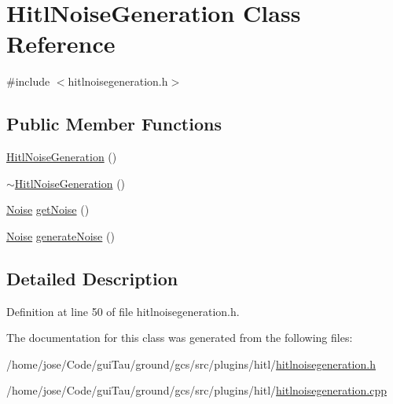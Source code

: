 \hypertarget{class_hitl_noise_generation}{\section{Hitl\-Noise\-Generation Class Reference}
\label{class_hitl_noise_generation}
}


{\ttfamily \#include $<$hitlnoisegeneration.\-h$>$}

\subsection*{Public Member Functions}
\begin{DoxyCompactItemize}
\item 
\hyperlink{group__hitlplugin_ga1dab19a6599c296ffb839d1449789da2}{Hitl\-Noise\-Generation} ()
\item 
\hyperlink{group__hitlplugin_ga86eb1b28193cc2594ee5bd38658eb06a}{$\sim$\-Hitl\-Noise\-Generation} ()
\item 
\hyperlink{struct_noise}{Noise} \hyperlink{group__hitlplugin_ga48da3a2284408957fb754e0e4488ab16}{get\-Noise} ()
\item 
\hyperlink{struct_noise}{Noise} \hyperlink{group__hitlplugin_ga1492fee962eb0c1d6b48d8a4167d6d67}{generate\-Noise} ()
\end{DoxyCompactItemize}


\subsection{Detailed Description}


Definition at line 50 of file hitlnoisegeneration.\-h.



The documentation for this class was generated from the following files\-:\begin{DoxyCompactItemize}
\item 
/home/jose/\-Code/gui\-Tau/ground/gcs/src/plugins/hitl/\hyperlink{hitlnoisegeneration_8h}{hitlnoisegeneration.\-h}\item 
/home/jose/\-Code/gui\-Tau/ground/gcs/src/plugins/hitl/\hyperlink{hitlnoisegeneration_8cpp}{hitlnoisegeneration.\-cpp}\end{DoxyCompactItemize}
